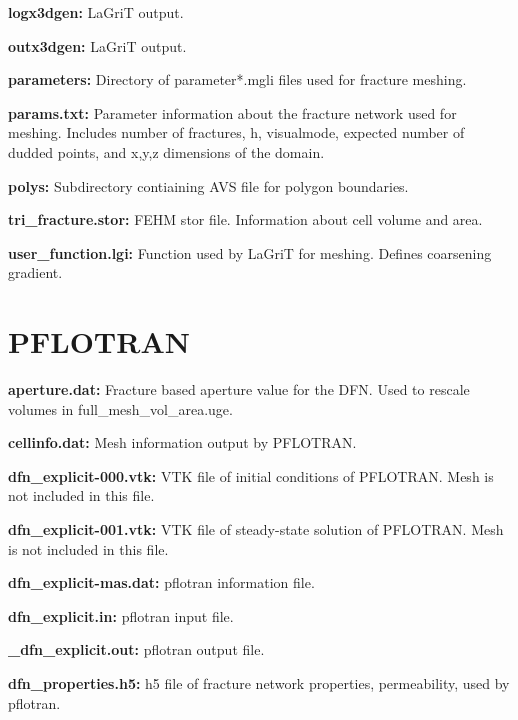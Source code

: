 \documentclass[letterpaper,10pt,english]{sphinxmanual}
\begin{document}
\textbf{logx3dgen:}
\label{output:logx3dgen}
LaGriT output.

\textbf{outx3dgen:}
\label{output:outx3dgen}
LaGriT output.

\textbf{parameters:}
\label{output:parameters}
Directory of parameter*.mgli files used for fracture meshing.

\textbf{params.txt:}
\label{output:params-txt}
Parameter information about the fracture network used for meshing. Includes number of fractures, h, visualmode, expected number of dudded points, and x,y,z dimensions of the domain.

\textbf{polys:}
\label{output:polys}
Subdirectory contiaining AVS file for polygon boundaries.

\textbf{tri\_fracture.stor:}
\label{output:tri-fracture-stor}
FEHM stor file. Information about cell volume and area.

\textbf{user\_function.lgi:}
\label{output:user-function-lgi}
Function used by LaGriT for meshing. Defines coarsening gradient.


\section{PFLOTRAN}
\label{output:id3}
\textbf{aperture.dat:}
\label{output:aperture-dat}
Fracture based aperture value for the DFN. Used to rescale volumes in full\_mesh\_vol\_area.uge.

\textbf{cellinfo.dat:}
\label{output:cellinfo-dat}
Mesh information output by PFLOTRAN.

\textbf{dfn\_explicit-000.vtk:}
\label{output:dfn-explicit-000-vtk}
VTK file of initial conditions of PFLOTRAN. Mesh is not included in this file.

\textbf{dfn\_explicit-001.vtk:}
\label{output:dfn-explicit-001-vtk}
VTK file of steady-state solution of PFLOTRAN. Mesh is not included in this file.

\textbf{dfn\_explicit-mas.dat:}
\label{output:dfn-explicit-mas-dat}
pflotran information file.

\textbf{dfn\_explicit.in:}
\label{output:dfn-explicit-in}
pflotran input file.

\textbf{\_dfn\_explicit.out:}
\label{output:dfn-explicit-out}
pflotran output file.

\textbf{dfn\_properties.h5:}
\label{output:dfn-properties-h5}
h5 file of fracture network properties, permeability, used by pflotran.
\end{document}
